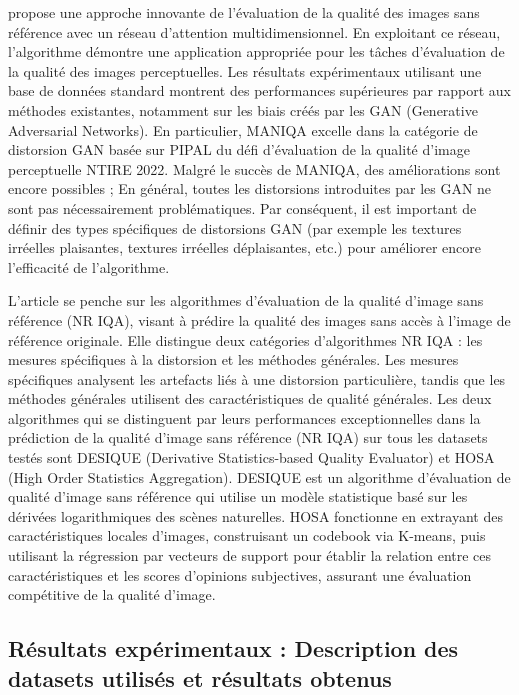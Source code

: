 \documentclass{ieeeaccess}
\begin{document}
 propose une approche innovante de l’évaluation de la qualité des images sans référence avec un réseau d’attention multidimensionnel. En exploitant ce réseau, l'algorithme démontre une application appropriée pour les tâches d’évaluation de la qualité des images perceptuelles. Les résultats expérimentaux utilisant une base de données standard montrent des performances supérieures par rapport aux méthodes existantes, notamment sur les biais créés par les GAN (Generative Adversarial Networks). En particulier, MANIQA excelle dans la catégorie de distorsion GAN basée sur PIPAL du défi d'évaluation de la qualité d'image perceptuelle NTIRE 2022. Malgré le succès de MANIQA,  des améliorations sont encore possibles ; En général, toutes les distorsions introduites par les GAN ne sont pas nécessairement problématiques. Par conséquent, il est important de définir des types spécifiques de distorsions GAN (par exemple les textures irréelles plaisantes, textures irréelles déplaisantes, etc.) pour améliorer encore l’efficacité de l’algorithme.  

 L'article se penche sur les algorithmes d'évaluation de la qualité d'image sans référence (NR IQA), visant à prédire la qualité des images sans accès à l'image de référence originale. Elle distingue deux catégories d'algorithmes NR IQA : les mesures spécifiques à la distorsion et les méthodes générales. Les mesures spécifiques analysent les artefacts liés à une distorsion particulière, tandis que les méthodes générales utilisent des caractéristiques de qualité générales. Les deux algorithmes qui se distinguent par leurs performances exceptionnelles dans la prédiction de la qualité d’image sans référence (NR IQA) sur tous les datasets testés sont DESIQUE (Derivative Statistics-based Quality Evaluator) et HOSA (High Order Statistics Aggregation). DESIQUE est un algorithme d'évaluation de qualité d'image sans référence qui utilise un modèle statistique basé sur les dérivées logarithmiques des scènes naturelles. HOSA fonctionne en extrayant des caractéristiques locales d'images, construisant un codebook via K-means, puis utilisant la régression par vecteurs de support pour établir la relation entre ces caractéristiques et les scores d'opinions subjectives, assurant une évaluation compétitive de la qualité d'image.  

\subsection{Résultats expérimentaux : Description des datasets utilisés et résultats obtenus}
\end{document}
